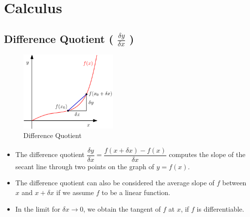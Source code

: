 \chapter{Calculus}

\section{Difference Quotient ( $\displaystyle\frac{\delta y}{\delta x}$ )}\label{Difference Quotient}

\begin{table}[H]
    \begin{minipage}{0.39\linewidth}
        \begin{figure}[H]
            \centering
            \includegraphics[height=4cm]{Pictures/maths/Difference Quotient.png}
            \caption{Difference Quotient}
        \end{figure}
    \end{minipage}
    \hfill
    \begin{minipage}{0.59\linewidth}
        \begin{itemize}
            \item The difference quotient \( \displaystyle\dfrac{\delta y}{\delta x} = \displaystyle\dfrac{f(x + \delta x) - f(x)}{\delta x} \) computes the slope of the secant line through two points on the graph of $y = f(x)$. 
            
            \item The difference quotient can also be considered the average slope of $f$ between $x$ and $x + \delta x$ if we assume $f$ to be a linear function. 
            
            \item In the limit for $\delta x \rightarrow 0$, we obtain the tangent of $f$ at $x$, if $f$ is differentiable.

        \end{itemize}
    \end{minipage}
\end{table}



